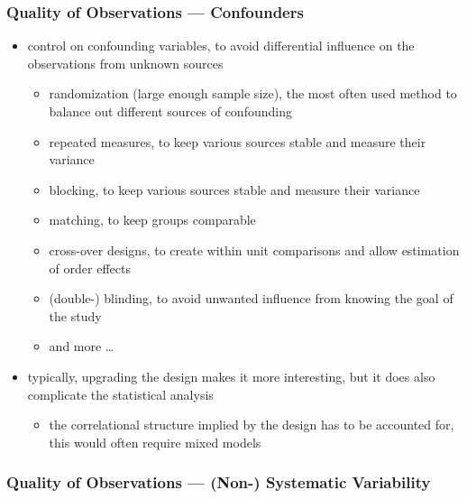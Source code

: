 \documentclass[]{article}
\providecommand{\tightlist}{%
  \setlength{\itemsep}{0pt}\setlength{\parskip}{0pt}}
\begin{document}
\subsubsection{Quality of Observations ---
Confounders}\label{quality-of-observations-confounders}

\begin{itemize}
\tightlist
\item
  control on confounding variables, to avoid differential influence on
  the observations from unknown sources

  \begin{itemize}
  \tightlist
  \item
    randomization (large enough sample size), the most often used method
    to balance out different sources of confounding
  \item
    repeated measures, to keep various sources stable and measure their
    variance
  \item
    blocking, to keep various sources stable and measure their variance
  \item
    matching, to keep groups comparable
  \item
    cross-over designs, to create within unit comparisons and allow
    estimation of order effects
  \item
    (double-) blinding, to avoid unwanted influence from knowing the
    goal of the study
  \item
    and more \ldots{} 
  \end{itemize}
\item
  typically, upgrading the design makes it more interesting, but it does
  also complicate the statistical analysis

  \begin{itemize}
  \tightlist
  \item
    the correlational structure implied by the design has to be
    accounted for, this would often require mixed models
  \end{itemize}
\end{itemize}

\subsubsection{Quality of Observations --- (Non-) Systematic
Variability}\label{quality-of-observations-non--systematic-variability}
\end{document}
